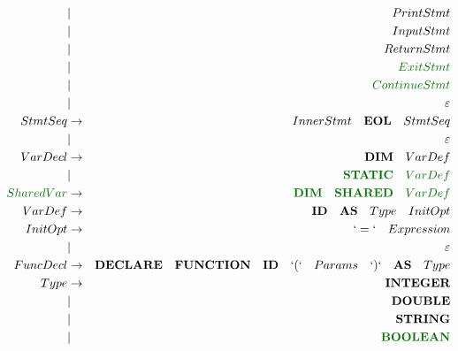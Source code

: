 \documentclass[a4paper,11pt,landscape,leqno]{article}
\begin{document}
\begin{eqnarray}
            &       |           & PrintStmt \\
            &       |           & InputStmt  \\
            &       |           & ReturnStmt  \\
            &       |           & \textcolor{green1}{ExitStmt}  \\
            &       |           & \textcolor{green1}{ContinueStmt}  \\
            &       |           & \varepsilon \\
StmtSeq     &    \rightarrow    & InnerStmt\quad \textbf{EOL}\quad StmtSeq   \\
            &       |           & \varepsilon \\
VarDecl     & \rightarrow       & \textbf{DIM}\quad VarDef \\
            &       |           & \textcolor{green1}{\textbf{STATIC}\quad VarDef} \\
\textcolor{green1}{SharedVar}&       \rightarrow           & \textcolor{green1}{\textbf{DIM}\quad \textbf{SHARED}\quad VarDef} \\
VarDef      & \rightarrow       & \textbf{ID}\quad \textbf{AS}\quad Type \quad InitOpt\\
InitOpt     &      \rightarrow  & `=`\quad Expression \\
            &       |           & \varepsilon \\
FuncDecl    &  \rightarrow      & \textbf{DECLARE}\quad \textbf{FUNCTION}\quad \textbf{ID}\quad `(` \quad Params \quad`)`\quad \textbf{AS}\quad Type   \\
Type        &    \rightarrow    &    \textbf{INTEGER}    \\
            &       |           & \textbf{DOUBLE}   \\
            &       |           & \textbf{STRING}   \\
            &       |           & \textcolor{green1}{\textbf{BOOLEAN}}  \\

\end{eqnarray}
\end{document}
